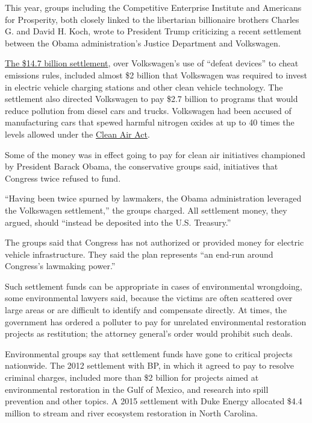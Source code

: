 This year, groups including the Competitive Enterprise Institute and
Americans for Prosperity, both closely linked to the libertarian
billionaire brothers Charles G. and David H. Koch, wrote to President
Trump criticizing a recent settlement between the Obama administration's
Justice Department and Volkswagen.

\href{https://www.nytimes3xbfgragh.onion/2016/06/28/business/volkswagen-settlement-diesel-scandal.html}{The
\$14.7 billion settlement}, over Volkswagen's use of ``defeat devices''
to cheat emissions rules, included almost \$2 billion that Volkswagen
was required to invest in electric vehicle charging stations and other
clean vehicle technology. The settlement also directed Volkswagen to pay
\$2.7 billion to programs that would reduce pollution from diesel cars
and trucks. Volkswagen had been accused of manufacturing cars that
spewed harmful nitrogen oxides at up to 40 times the levels allowed
under the
\href{http://topics.nytimes3xbfgragh.onion/top/reference/timestopics/subjects/c/clean_air_act/index.html?inline=nyt-classifier}{Clean
Air Act}.

Some of the money was in effect going to pay for clean air initiatives
championed by President Barack Obama, the conservative groups said,
initiatives that Congress twice refused to fund.

``Having been twice spurned by lawmakers, the Obama administration
leveraged the Volkswagen settlement,'' the groups charged. All
settlement money, they argued, should ``instead be deposited into the
U.S. Treasury.''

The groups said that Congress has not authorized or provided money for
electric vehicle infrastructure. They said the plan represents ``an
end-run around Congress's lawmaking power.''

Such settlement funds can be appropriate in cases of environmental
wrongdoing, some environmental lawyers said, because the victims are
often scattered over large areas or are difficult to identify and
compensate directly. At times, the government has ordered a polluter to
pay for unrelated environmental restoration projects as restitution; the
attorney general's order would prohibit such deals.

Environmental groups say that settlement funds have gone to critical
projects nationwide. The 2012 settlement with BP, in which it agreed to
pay to resolve criminal charges, included more than \$2 billion for
projects aimed at environmental restoration in the Gulf of Mexico, and
research into spill prevention and other topics. A 2015 settlement with
Duke Energy allocated \$4.4 million to stream and river ecosystem
restoration in North Carolina.

